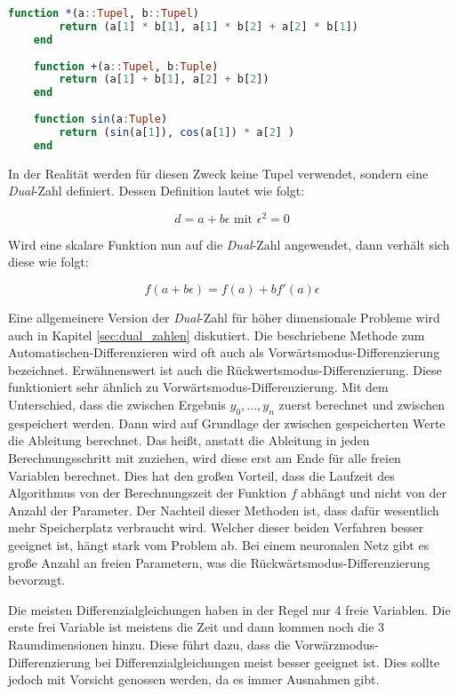 \begin{lstlisting}[language=Julia]
	function *(a::Tupel, b::Tupel)
    	return (a[1] * b[1], a[1] * b[2] + a[2] * b[1]) 
    end
    
    function +(a::Tupel, b:Tuple)
    	return (a[1] + b[1], a[2] + b[2])
    end
    
    function sin(a:Tuple)
    	return (sin(a[1]), cos(a[1]) * a[2] ) 
    end
\end{lstlisting}

In der Realität werden für diesen Zweck keine Tupel verwendet, sondern eine \textit{Dual}-Zahl definiert.
Dessen Definition lautet wie folgt:

\begin{equation}
	d = a + b \epsilon \text{ mit } \epsilon^2 = 0
\end{equation}

Wird eine skalare Funktion nun auf die \textit{Dual}-Zahl angewendet, dann verhält sich diese wie folgt:

\begin{equation}
	f( a + b \epsilon) = f(a) + b f'(a) \epsilon
\end{equation}

Eine allgemeinere Version der \textit{Dual}-Zahl für höher dimensionale Probleme wird auch in Kapitel \ref{sec:dual_zahlen} diskutiert.
Die beschriebene Methode zum Automatischen-Differenzieren wird oft auch als Vorwärtsmodus-Differenzierung bezeichnet.
Erwähnenswert ist auch die Rückwertsmodus-Differenzierung.
Diese funktioniert sehr ähnlich zu Vorwärtsmodus-Differenzierung.
Mit dem Unterschied, dass die zwischen Ergebnis $y_0, ... , y_n$ zuerst berechnet und zwischen gespeichert werden.
Dann wird auf Grundlage der zwischen gespeicherten Werte die Ableitung berechnet.
Das heißt, anstatt die Ableitung in jeden Berechnungsschritt mit zuziehen, wird diese erst am Ende für alle freien Variablen berechnet.
Dies hat den großen Vorteil, dass die Laufzeit des Algorithmus von der Berechnungszeit der Funktion $f$ abhängt und nicht von der Anzahl der Parameter.
Der Nachteil dieser Methoden ist, dass dafür wesentlich mehr Speicherplatz verbraucht wird.
Welcher dieser beiden Verfahren besser geeignet ist, hängt stark vom Problem ab.
Bei einem neuronalen Netz gibt es große Anzahl an freien Parametern, was die Rückwärtsmodus-Differenzierung bevorzugt.

Die meisten Differenzialgleichungen haben in der Regel nur 4 freie Variablen.
Die erste frei Variable ist meistens die Zeit und dann kommen noch die 3 Raumdimensionen hinzu.
Diese führt dazu, dass die Vorwärzmodus-Differenzierung bei Differenzialgleichungen meist besser geeignet ist.
Dies sollte jedoch mit Vorsicht genossen werden, da es immer Ausnahmen gibt.
